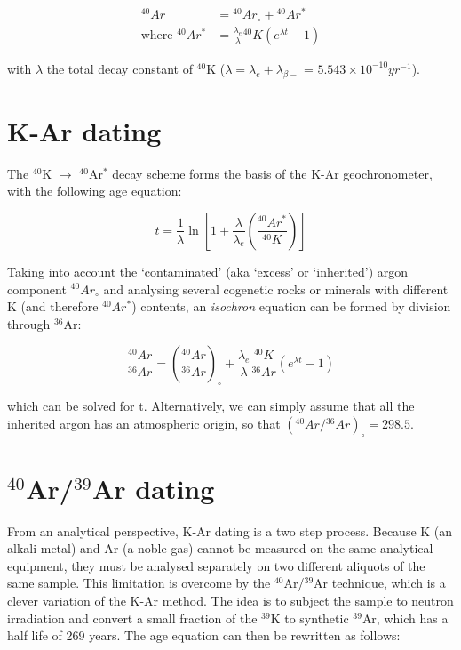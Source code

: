 \documentclass{book}
\begin{document}
\begin{equation}
\begin{array}{rl}
^{40}Ar & = {}^{40}Ar_\circ + {}^{40}Ar^*\\ 
\mbox{where~} {}^{40}Ar^* & =
  \frac{\lambda_e}{\lambda} {}^{40}K \left( e^{\lambda t} - 1 \right)
\end{array}
\label{eq:Ar}
\end{equation}

with $\lambda$ the total decay constant of $^{40}$K ($\lambda =
\lambda_e + \lambda_{\beta-}$ = $5.543 \times 10^{-10} yr^{-1}$).

\section{K-Ar dating}

The $^{40}$K $\rightarrow$ $^{40}$Ar$^*$ decay scheme forms the basis
of the K-Ar geochronometer, with the following age equation:

\begin{equation}
t = \frac{1}{\lambda} \ln\left[ 1 + \frac{\lambda}{\lambda_e}
  \left(\frac{^{40}Ar^*}{^{40}K}\right) \right]
\label{eq:K-Ar}
\end{equation}

Taking into account the `contaminated' (aka `excess' or `inherited')
argon component $^{40}Ar_\circ$ and analysing several cogenetic rocks
or minerals with different K (and therefore $^{40}Ar^*$) contents, an
\emph{isochron} equation can be formed by division through $^{36}$Ar:

\begin{equation}
\frac{^{40}Ar}{^{36}Ar} = \left(\frac{^{40}Ar}{^{36}Ar}\right)_\circ +
\frac{\lambda_e}{\lambda} \frac{^{40}K}{^{36}Ar} \left( e^{\lambda t} - 1 \right)
\label{eq:K-Ar-isochron}
\end{equation}

which can be solved for t. Alternatively, we can simply assume that
all the inherited argon has an atmospheric origin, so that
$({}^{40}Ar/{}^{36}Ar)_\circ = 298.5$.

\section{$^{40}$Ar/$^{39}$Ar dating}
\label{sec:Ar-Ar}

From an analytical perspective, K-Ar dating is a two step
process. Because K (an alkali metal) and Ar (a noble gas) cannot be
measured on the same analytical equipment, they must be analysed
separately on two different aliquots of the same sample.  This
limitation is overcome by the $^{40}$Ar/$^{39}$Ar technique, which is
a clever variation of the K-Ar method. The idea is to subject the
sample to neutron irradiation and convert a small fraction of the
$^{39}$K to synthetic $^{39}$Ar, which has a half life of 269
years. The age equation can then be rewritten as follows:
\end{document}
